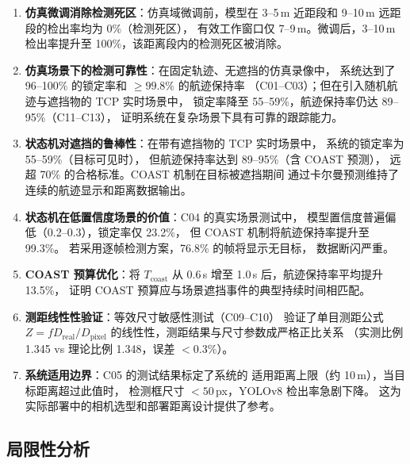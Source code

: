 \documentclass[12pt, a4paper]{ctexart}
\begin{document}
\begin{enumerate}
  \item \textbf{仿真微调消除检测死区}：仿真域微调前，模型在 3--5\,m
        近距段和 9--10\,m 远距段的检出率均为 0\%（检测死区），
        有效工作窗口仅 7--9\,m。微调后，3--10\,m
        检出率提升至 100\%，该距离段内的检测死区被消除。

  \item \textbf{仿真场景下的检测可靠性}：在固定轨迹、无遮挡的仿真录像中，
        系统达到了 96--100\% 的锁定率和 $\geq 99.8\%$ 的航迹保持率
        （C01--C03）；但在引入随机航迹与遮挡物的 TCP 实时场景中，
        锁定率降至 55--59\%，航迹保持率仍达 89--95\%（C11--C13），
        证明系统在复杂场景下具有可靠的跟踪能力。

  \item \textbf{状态机对遮挡的鲁棒性}：在带有遮挡物的 TCP 实时场景中，
        系统的锁定率为 55--59\%（目标可见时），
        但航迹保持率达到 89--95\%（含 COAST 预测），
        远超 70\% 的合格标准。COAST 机制在目标被遮挡期间
        通过卡尔曼预测维持了连续的航迹显示和距离数据输出。

  \item \textbf{状态机在低置信度场景的价值}：C04 的真实场景测试中，
        模型置信度普遍偏低（0.2--0.3），锁定率仅 23.2\%，
        但 COAST 机制将航迹保持率提升至 99.3\%。
        若采用逐帧检测方案，76.8\% 的帧将显示无目标，
        数据断闪严重。

  \item \textbf{COAST 预算优化}：将 $T_{\text{coast}}$ 从 0.6\,s
        增至 1.0\,s 后，航迹保持率平均提升 13.5\%，
        证明 COAST 预算应与场景遮挡事件的典型持续时间相匹配。

  \item \textbf{测距线性性验证}：等效尺寸敏感性测试（C09--C10）
        验证了单目测距公式 $Z = fD_{\text{real}}/D_{\text{pixel}}$
        的线性性，测距结果与尺寸参数成严格正比关系
        （实测比例 1.345 vs 理论比例 1.348，误差 $< 0.3\%$）。

  \item \textbf{系统适用边界}：C05 的测试结果标定了系统的
        适用距离上限（约 10\,m），当目标距离超过此值时，
        检测框尺寸 $< 50$\,px，YOLOv8 检出率急剧下降。
        这为实际部署中的相机选型和部署距离设计提供了参考。
\end{enumerate}

\subsection{局限性分析}
\end{document}
